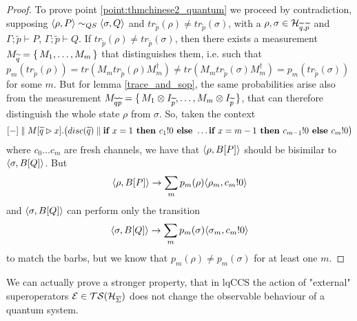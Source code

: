 \begin{proof}
To prove point \ref{point:thmchinese2_quantum} we proceed by contradiction, supposing  $\langle\rho, P\rangle \sim_{QS} \langle\sigma, Q\rangle$  and $tr_{\widetilde{p}}(\rho) \neq tr_{\widetilde{p}}(\sigma)$, with a $\rho, \sigma \in \mathcal{H}_{\widetilde{q}, \widetilde{p}}$ and $\Gamma;\widetilde{p} \vdash P$, $\Gamma;\widetilde{p} \vdash Q$.
 If $tr_{\widetilde{p}}(\rho) \neq tr_{\widetilde{p}}(\sigma)$, then there exists a measurement $M_{\widetilde{q}} = \set{M_1, \ldots ,M_{m}}$ that distinguishes them, i.e. such that $p_m(tr_{\widetilde{p}}(\rho)) = tr(M_m tr_{\widetilde{p}}(\rho) M_m^\dagger) \neq tr(M_m tr_{\widetilde{p}}(\sigma) M_m^\dagger) = p_m(tr_{\widetilde{p}}(\sigma))$ for some $m$. But for lemma \ref{trace_and_sop}, the same probabilities arise also from the measurement $M_{\widetilde{q}\widetilde{p}} = \set{M_1 \otimes I_{\widetilde{p}}, \ldots , M_m \otimes I_{\widetilde{p}}}$, that  can therefore distinguish the whole state $\rho$ from $\sigma$. So, taken the context 
\[[{-}] \parallel M[\widetilde{q} \rhd x].\big(disc(\widetilde{q}) \parallel \textbf{if } x = 1 \textbf{ then } c_1!0 \textbf{ else } \ldots \textbf{if } x = m-1 \textbf{ then } c_{m-1}!0 \textbf{ else } c_m!0\big) \]
where $c_0 \ldots c_m$ are fresh channels, we have that $\langle\rho, B[P]\rangle$ should be bisimilar to $\langle\sigma, B[Q]\rangle$. But 
\[\langle\rho, B[P]\rangle \rightarrow \sum_m p_m(\rho) \langle\rho_m, c_m!0\rangle\]
and $\langle\sigma, B[Q]\rangle$ can perform only the transition \[\langle\sigma, B[Q]\rangle \rightarrow \sum_m p_m(\sigma) \langle\sigma_m, c_m!0\rangle\] to match the barbs, but we know that $p_m(\rho) \neq p_m(\sigma)$ for at least one $m$.
\end{proof}

We can actually prove a stronger property, that in lqCCS the action of "external" superoperators $\mathcal{E} \in \mathcal{TS}(\mathcal{H}_{\overline{\Sigma}})$ does not change the observable behaviour of a quantum system.



